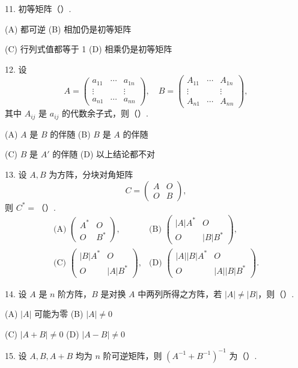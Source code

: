 \documentclass[UTF8, 12pt, fontset=fandol, oneside]{ctexart}
\begin{document}
11. 初等矩阵（\quad ）.

(A) 都可逆\qquad
(B) 相加仍是初等矩阵

(C) 行列式值都等于 1\qquad
(D) 相乘仍是初等矩阵

12. 设
\[
A=
\left(
\begin{array}{ccc}
a_{11} & \cdots & a_{1n}\\
\vdots & & \vdots\\
a_{n1} & \cdots & a_{nn}
\end{array}
\right),\quad
B=
\left(
\begin{array}{ccc}
A_{11} & \cdots & A_{1n}\\
\vdots & & \vdots\\
A_{n1} & \cdots & A_{nn}
\end{array}
\right),
\]
其中 $A_{ij}$ 是 $a_{ij}$ 的代数余子式，则（\quad ）.

(A) $A$ 是 $B$ 的伴随\qquad
(B) $B$ 是 $A$ 的伴随

(C) $B$ 是 $A'$ 的伴随\qquad
(D) 以上结论都不对

13. 设 $A,B$ 为方阵，分块对角矩阵
\[
C=
\left(
\begin{array}{cc}
A & O\\
O & B
\end{array}
\right),
\]
则 $C^*=$（\quad ）.
\[
\begin{array}{ll}
\text{(A) }\left(\begin{array}{cc}A^*&O\\O&B^*\end{array}\right),&
\text{(B) }\left(\begin{array}{cc}|A|A^*&O\\O&|B|B^*\end{array}\right),\\[1em]
\text{(C) }\left(\begin{array}{cc}|B|A^*&O\\O&|A|B^*\end{array}\right),&
\text{(D) }\left(\begin{array}{cc}|A||B|A^*&O\\O&|A||B|B^*\end{array}\right).
\end{array}
\]

14. 设 $A$ 是 $n$ 阶方阵，$B$ 是对换 $A$ 中两列所得之方阵，若 $|A|\ne|B|$，则（\quad ）.

(A) $|A|$ 可能为零\qquad
(B) $|A|\ne0$

(C) $|A+B|\ne0$\qquad
(D) $|A-B|\ne0$

15. 设 $A,B,A+B$ 均为 $n$ 阶可逆矩阵，则 $(A^{-1}+B^{-1})^{-1}$ 为（\quad ）.
\end{document}
